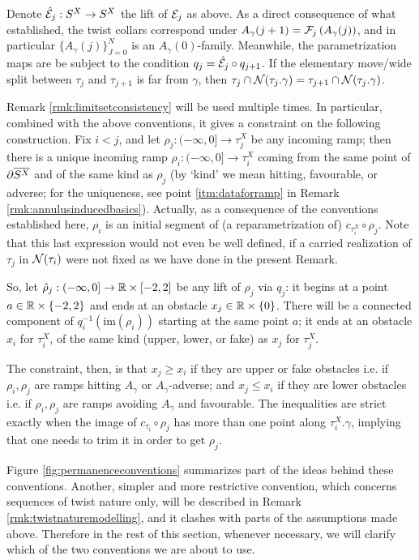 \begin{rmk}
Denote $\hat{\mathcal{E}}_j:S^X\rightarrow S^X$ the lift of $\mathcal{E}_j$ as above. As a direct consequence of what established, the twist collars correspond under $A_\gamma(j+1)=\mathcal{F}_j\left(A_\gamma(j)\right)$, and in particular $\{A_\gamma(j)\}_{J=0}^N$ is an $A_\gamma(0)$-family. Meanwhile, the parametrization maps are be subject to the condition $q_j=\hat{\mathcal{E}}_j\circ q_{j+1}$. If the elementary move/wide split between $\tau_j$ and $\tau_{j+1}$ is far from $\gamma$, then $\tau_j\cap{\mathcal N}(\tau_j.\gamma)=\tau_{j+1}\cap{\mathcal N}(\tau_j.\gamma)$.

Remark \ref{rmk:limitsetconsistency} will be used multiple times. In particular, combined with the above conventions, it gives a constraint on the following construction. Fix $i<j$, and let $\rho_j:(-\infty,0]\rightarrow \tau_j^X$ be any incoming ramp; then there is a unique incoming ramp $\rho_i:(-\infty,0]\rightarrow \tau_i^X$ coming from the same point of $\partial\overline{S^X}$ and of the same kind as $\rho_j$ (by `kind' we mean hitting, favourable, or adverse; for the uniqueness, see point \ref{itm:dataforramp} in Remark \ref{rmk:annulusinducedbasics}). Actually, as a consequence of the conventions established here, $\rho_i$ is an initial segment of (a reparametrization of) $c_{\tau_i^X} \circ \rho_j$. Note that this last expression would not even be well defined, if a carried realization of $\tau_j$ in ${\mathcal N}(\tau_i)$ were not fixed as we have done in the present Remark.

So, let $\hat\rho_j: (-\infty,0]\rightarrow \mathbb R\times[-2,2]$ be any lift of $\rho_j$ via $q_j$: it begins at a point $a\in\mathbb R\times\{-2,2\}$ and ends at an obstacle $x_j\in \mathbb R\times\{0\}$. There will be a connected component of $q_i^{-1}(\mathrm{im}(\rho_i))$ starting at the same point $a$; it ends at an obstacle $x_i$ for $\tau_i^X$, of the same kind (upper, lower, or fake) as $x_j$ for $\tau_j^X$.

The constraint, then, is that $x_j\geq x_i$ if they are upper or fake obstacles i.e. if $\rho_i,\rho_j$ are ramps hitting $A_\gamma$ or $A_\gamma$-adverse; and $x_j\leq x_i$ if they are lower obstacles i.e. if $\rho_i,\rho_j$ are ramps avoiding $A_\gamma$ and favourable. The inequalities are strict exactly when the image of $c_{\tau_i} \circ \rho_j$ has more than one point along $\tau_i^X.\gamma$, implying that one needs to trim it in order to get $\rho_j$.

Figure \ref{fig:permanenceconventions} summarizes part of the ideas behind these conventions. Another, simpler and more restrictive convention, which concerns sequences of twist nature only, will be described in Remark \ref{rmk:twistnaturemodelling}, and it clashes with parts of the assumptions made above. Therefore in the rest of this section, whenever necessary, we will clarify which of the two conventions we are about to use.
\end{rmk}

